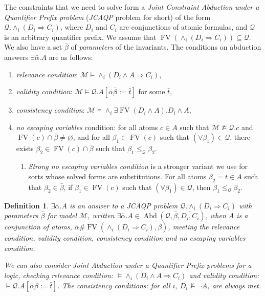\documentclass{article}
\newcommand{\assign}{:=}
\newcommand{\tmem}[1]{{\em #1\/}}
\newcommand{\tmop}[1]{\ensuremath{\operatorname{#1}}}
\newtheorem{definition}{Definition}
{\theorembodyfont{\rmfamily}\newtheorem{example}{Example}}
\begin{document}
The constraints that we need to solve form a {\tmem{Joint Constraint Abduction
under a Quantifier Prefix problem}} ({\tmem{JCAQP}} problem for short) of the
form $\mathcal{Q}. \wedge_i (D_i \Rightarrow C_i)$, where $D_i$ and $C_i$ are
conjunctions of atomic formulas, and $\mathcal{Q}$ is an arbitrary quantifier
prefix. We assume that $\tmop{FV} (\wedge_i (D_i \Rightarrow C_i)) \subseteq
\mathcal{Q}$. We also have a set $\bar{\beta}$ of {\tmem{parameters}} of the
invariants. The conditions on abduction answers $\exists \bar{\alpha} .A$ are
as follows:
\begin{enumerate}
  \item {\tmem{relevance condition}}: $\mathcal{M} \vDash \wedge_i (D_i \wedge
  A \Rightarrow C_i)$,
  
  \item {\tmem{validity condition}}: $\mathcal{M} \vDash \mathcal{Q}.A
  [\bar{\alpha} \bar{\beta} \assign \bar{t}]$ for some $\bar{t}$,
  
  \item {\tmem{consistency condition}}: $\mathcal{M} \vDash \wedge_i \exists
  \tmop{FV} (D_i \wedge A) .D_i \wedge A$,
  
  \item {\tmem{no escaping variables}} condition: for all atoms $c \in A$ such
  that $\mathcal{M} \nvDash \mathcal{Q}.c$ and $\tmop{FV} (c) \cap \bar{\beta}
  \neq \varnothing$, and for all $\beta_1 \in \tmop{FV} (c)$ such that
  $(\forall \beta_1) \in \mathcal{Q}$, there exists $\beta_2 \in \tmop{FV} (c)
  \cap \bar{\beta}$ such that $\beta_1 \leqslant_{\mathcal{Q}} \beta_2$.
  \begin{enumerate}
    \item {\tmem{Strong no escaping variables condition}} is a stronger
    variant we use for sorts whose solved forms are substitutions. For all
    atoms $\beta_2 \dot{=} t \in A$ such that $\beta_2 \in \bar{\beta}$, if
    $\beta_1 \in \tmop{FV} (c)$ such that $(\forall \beta_1) \in \mathcal{Q}$,
    then $\beta_1 \leqslant_{\mathcal{Q}} \beta_2$.
  \end{enumerate}
\end{enumerate}
\begin{definition}
  \label{AbdAnsDef}$\exists \bar{\alpha} .A$ is an answer to a JCAQP problem
  $\mathcal{Q}. \wedge_i (D_i \Rightarrow C_i)$ with parameters $\bar{\beta}$
  for model $\mathcal{M}$, written $\exists \bar{\alpha} .A \in \tmop{Abd}
  (\mathcal{Q}, \bar{\beta}, \overline{D_i, C_i})$, when $A$ is a conjunction
  of atoms, $\bar{\alpha} \# \tmop{FV} (\wedge_i (D_i \Rightarrow C_i),
  \bar{\beta})$, meeting the relevance condition, validity condition,
  consistency condition and {\tmem{no escaping variables}} condition.
  
  We can also consider Joint Abduction under a Quantifier Prefix problems for
  a logic, checking relevance condition: $\vDash \wedge_i (D_i \wedge A
  \Rightarrow C_i)$ and validity condition: $\vDash \mathcal{Q}.A
  [\bar{\alpha} \bar{\beta} \assign \bar{t}]$. The consistency conditions: for
  all $i$, $D_i \nvDash \neg A$, are always met.
\end{definition}
\end{document}
